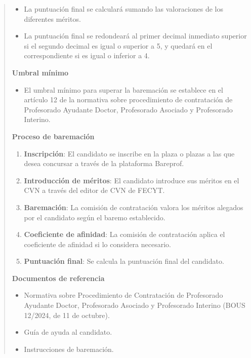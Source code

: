 \documentclass[12pt,a4paper,oneside]{report}
\begin{document}
\begin{itemize}
\begin{itemize}
\begin{quote}
\begin{itemize}
  \item La puntuación final se calculará sumando las valoraciones de los diferentes méritos.
  \item La puntuación final se redondeará al primer decimal inmediato superior si el segundo decimal es igual o superior a 5, y quedará en el correspondiente si es igual o inferior a 4.
\end{itemize}


\noindent\textbf{Umbral mínimo}\\

\begin{itemize}
  \item El umbral mínimo para superar la baremación se establece en el artículo 12 de la normativa sobre procedimiento de contratación de Profesorado Ayudante Doctor, Profesorado Asociado y Profesorado Interino.
\end{itemize}


\noindent\textbf{Proceso de baremación}\\

\begin{enumerate}
  \item \textbf{Inscripción}: El candidato se inscribe en la plaza o plazas a las que desea concursar a través de la plataforma Bareprof.
  \item \textbf{Introducción de méritos}: El candidato introduce sus méritos en el CVN a través del editor de CVN de FECYT.
  \item \textbf{Baremación}: La comisión de contratación valora los méritos alegados por el candidato según el baremo establecido.
  \item \textbf{Coeficiente de afinidad}: La comisión de contratación aplica el coeficiente de afinidad si lo considera necesario.
  \item \textbf{Puntuación final}: Se calcula la puntuación final del candidato.
\end{enumerate}


\noindent\textbf{Documentos de referencia}\\

\begin{itemize}
  \item Normativa sobre Procedimiento de Contratación de Profesorado Ayudante Doctor, Profesorado Asociado y Profesorado Interino (BOUS 12/2024, de 11 de octubre).
  \item Guía de ayuda al candidato.
  \item Instrucciones de baremación.
\end{itemize}


\end{quote}
\end{itemize}
\end{itemize}
\end{document}
